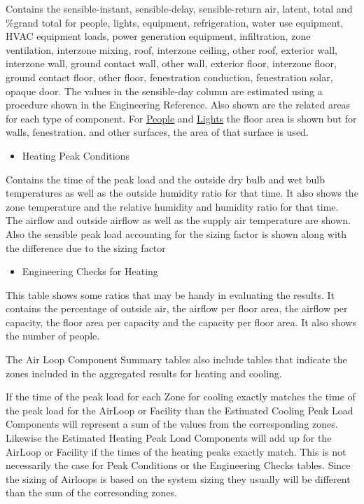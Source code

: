 Contains the sensible-instant, sensible-delay, sensible-return air, latent, total and \%grand total for people, lights, equipment, refrigeration, water use equipment, HVAC equipment loads, power generation equipment, infiltration, zone ventilation, interzone mixing, roof, interzone ceiling, other roof, exterior wall, interzone wall, ground contact wall, other wall, exterior floor, interzone floor, ground contact floor, other floor, fenestration conduction, fenestration solar, opaque door. The values in the sensible-day column are estimated using a procedure shown in the Engineering Reference. Also shown are the related areas for each type of component. For \hyperref[people]{People} and \hyperref[lights-000]{Lights} the floor area is shown but for walls, fenestration. and other surfaces, the area of that surface is used.

\begin{itemize}
\tightlist
\item
  Heating Peak Conditions
\end{itemize}

Contains the time of the peak load and the outside dry bulb and wet bulb temperatures as well as the outside humidity ratio for that time. It also shows the zone temperature and the relative humidity and humidity ratio for that time. The airflow and outside airflow as well as the supply air temperature are shown. Also the sensible peak load accounting for the sizing factor is shown along with the difference due to the sizing factor

\begin{itemize}
\tightlist
\item
  Engineering Checks for Heating
\end{itemize}

This table shows some ratios that may be handy in evaluating the results. It contains the percentage of outside air, the airflow per floor area, the airflow per capacity, the floor area per capacity and the capacity per floor area. It also shows the number of people.

The Air Loop Component Summary tables also include tables that indicate the zones included in the aggregated results for heating and cooling.

If the time of the peak load for each Zone for cooling exactly matches the time of the peak load for the AirLoop or Facility than the Estimated Cooling Peak Load Components will represent a sum of the values from the corresponding zones. Likewise the Estimated Heating Peak Load Components will add up for the AirLoop or Facility if the times of the heating peaks exactly match. This is not necessarily the case for Peak Conditions or the Engineering Checks tables. Since the sizing of Airloops is based on the system sizing they usually will be different than the sum of the corresonding zones.

